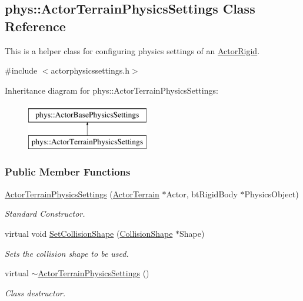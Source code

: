 \hypertarget{classphys_1_1ActorTerrainPhysicsSettings}{
\subsection{phys::ActorTerrainPhysicsSettings Class Reference}
\label{classphys_1_1ActorTerrainPhysicsSettings}
}


This is a helper class for configuring physics settings of an \hyperlink{classphys_1_1ActorRigid}{ActorRigid}.  




{\ttfamily \#include $<$actorphysicssettings.h$>$}

Inheritance diagram for phys::ActorTerrainPhysicsSettings:\begin{figure}[H]
\begin{center}
\leavevmode
\includegraphics[height=2.000000cm]{classphys_1_1ActorTerrainPhysicsSettings}
\end{center}
\end{figure}
\subsubsection*{Public Member Functions}
\begin{DoxyCompactItemize}
\item 
\hyperlink{classphys_1_1ActorTerrainPhysicsSettings_a00f816a71382797ab600c79970827f4c}{ActorTerrainPhysicsSettings} (\hyperlink{classphys_1_1ActorTerrain}{ActorTerrain} $\ast$Actor, btRigidBody $\ast$PhysicsObject)
\begin{DoxyCompactList}\small\item\em Standard Constructor. \item\end{DoxyCompactList}\item 
virtual void \hyperlink{classphys_1_1ActorTerrainPhysicsSettings_a3f74f9b872b3c21364c1e489a6d39fbb}{SetCollisionShape} (\hyperlink{classphys_1_1CollisionShape}{CollisionShape} $\ast$Shape)
\begin{DoxyCompactList}\small\item\em Sets the collision shape to be used. \item\end{DoxyCompactList}\item 
\hypertarget{classphys_1_1ActorTerrainPhysicsSettings_a48c82a9bfc5daacf6d75f8e8f492db93}{
virtual \hyperlink{classphys_1_1ActorTerrainPhysicsSettings_a48c82a9bfc5daacf6d75f8e8f492db93}{$\sim$ActorTerrainPhysicsSettings} ()}
\label{classphys_1_1ActorTerrainPhysicsSettings_a48c82a9bfc5daacf6d75f8e8f492db93}

\begin{DoxyCompactList}\small\item\em Class destructor. \item\end{DoxyCompactList}\end{DoxyCompactItemize}
